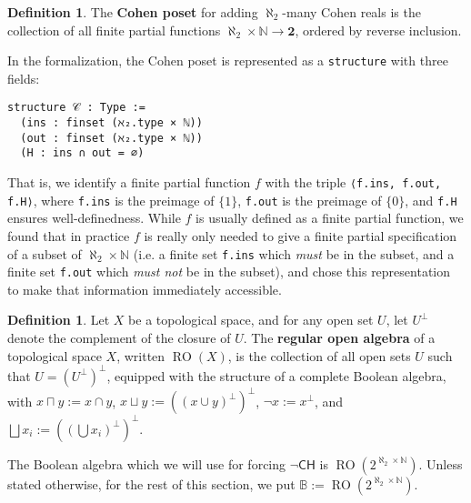 \documentclass[a4paper,USenglish,cleveref, autoref]{lipics-v2019}
\newcommand{\B}{\mathbb{B}}
\newcommand{\lil}{\lstinline}
\theoremstyle{theorem}
\theoremstyle{definition}
\newtheorem{defn}[definition]{Definition}
\begin{document}
\begin{defn}
  The \textbf{Cohen poset} for adding $\aleph_2$-many Cohen reals is the collection of all finite partial functions $\aleph_2 \times \mathbb{N} \to \mathbf{2}$, ordered by reverse inclusion.
\end{defn}

In the formalization, the Cohen poset is represented as a \lstinline{structure} with three fields:
\begin{lstlisting}
structure 𝒞 : Type :=
  (ins : finset (ℵ₂.type × ℕ))
  (out : finset (ℵ₂.type × ℕ))
  (H : ins ∩ out = ∅)
\end{lstlisting}

That is, we identify a finite partial function $f$ with the triple \lil{⟨f.ins, f.out, f.H⟩}, where \lil{f.ins} is the preimage of $\{1\}$, \lil{f.out} is the preimage of $\{0\}$, and \lil{f.H} ensures well-definedness. While $f$ is usually defined as a finite partial function, we found that in practice $f$ is really only needed to give a finite partial specification of a subset of $\aleph_2 \times \mathbb{N}$ (i.e. a finite set \lil{f.ins} which \emph{must} be in the subset, and a finite set \lil{f.out} which \emph{must not} be in the subset), and chose this representation to make that information immediately accessible.

\begin{defn}
  Let $X$ be a topological space, and for any open set $U$, let $U^\perp$ denote the complement of the closure of $U$. The \textbf{regular open algebra} of a topological space $X$, written $\operatorname{RO}(X)$, is the collection of all open sets $U$ such that $U = (U^\perp)^\perp$, equipped with the structure of a complete Boolean algebra, with $x \sqcap y := x \cap y$, $x \sqcup y := ((x \cup y)^\perp)^\perp$, $\neg x := x^\perp$, and $\bigsqcup x_i := ((\bigcup x_i)^\perp)^\perp$.
\end{defn}

The Boolean algebra which we will use for forcing $\neg\mathsf{CH}$ is $\operatorname{RO}(2^{\aleph_2 \times \mathbb{N}})$. Unless stated otherwise, for the rest of this section, we put $\B := \operatorname{RO}(2^{\aleph_2 \times \mathbb{N}})$.
\end{document}
